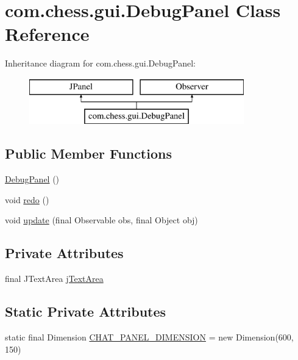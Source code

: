 \hypertarget{classcom_1_1chess_1_1gui_1_1_debug_panel}{}\section{com.\+chess.\+gui.\+Debug\+Panel Class Reference}
\label{classcom_1_1chess_1_1gui_1_1_debug_panel}
Inheritance diagram for com.\+chess.\+gui.\+Debug\+Panel\+:\begin{figure}[H]
\begin{center}
\leavevmode
\includegraphics[height=2.000000cm]{classcom_1_1chess_1_1gui_1_1_debug_panel}
\end{center}
\end{figure}
\subsection*{Public Member Functions}
\begin{DoxyCompactItemize}
\item 
\mbox{\hyperlink{classcom_1_1chess_1_1gui_1_1_debug_panel_a4cf57048b300c61b04e88f6ce4fb2785}{Debug\+Panel}} ()
\item 
void \mbox{\hyperlink{classcom_1_1chess_1_1gui_1_1_debug_panel_a73a6ce9aa3a2778c69f495eaf26de843}{redo}} ()
\item 
void \mbox{\hyperlink{classcom_1_1chess_1_1gui_1_1_debug_panel_a4b42f87aac96a91e04edf9209d4d309b}{update}} (final Observable obs, final Object obj)
\end{DoxyCompactItemize}
\subsection*{Private Attributes}
\begin{DoxyCompactItemize}
\item 
final J\+Text\+Area \mbox{\hyperlink{classcom_1_1chess_1_1gui_1_1_debug_panel_a2819e262e8a9d2208c9fc69e6e35866a}{j\+Text\+Area}}
\end{DoxyCompactItemize}
\subsection*{Static Private Attributes}
\begin{DoxyCompactItemize}
\item 
static final Dimension \mbox{\hyperlink{classcom_1_1chess_1_1gui_1_1_debug_panel_a0f94b47fa97bab91c1dfa9de0f0de8be}{C\+H\+A\+T\+\_\+\+P\+A\+N\+E\+L\+\_\+\+D\+I\+M\+E\+N\+S\+I\+ON}} = new Dimension(600, 150)
\end{DoxyCompactItemize}


